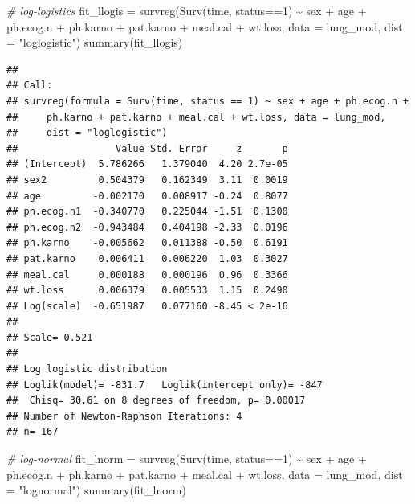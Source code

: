 \documentclass[
]{article}
\newenvironment{Shaded}{\begin{snugshade}}{\end{snugshade}}
\newcommand{\AttributeTok}[1]{\textcolor[rgb]{0.77,0.63,0.00}{#1}}
\newcommand{\CommentTok}[1]{\textcolor[rgb]{0.56,0.35,0.01}{\textit{#1}}}
\newcommand{\DecValTok}[1]{\textcolor[rgb]{0.00,0.00,0.81}{#1}}
\newcommand{\FunctionTok}[1]{\textcolor[rgb]{0.00,0.00,0.00}{#1}}
\newcommand{\NormalTok}[1]{#1}
\newcommand{\OtherTok}[1]{\textcolor[rgb]{0.56,0.35,0.01}{#1}}
\newcommand{\SpecialCharTok}[1]{\textcolor[rgb]{0.00,0.00,0.00}{#1}}
\newcommand{\StringTok}[1]{\textcolor[rgb]{0.31,0.60,0.02}{#1}}
\begin{document}
\begin{Shaded}
\begin{Highlighting}[]
\CommentTok{\# log{-}logistics}
\NormalTok{fit\_llogis }\OtherTok{=} \FunctionTok{survreg}\NormalTok{(}\FunctionTok{Surv}\NormalTok{(time, status}\SpecialCharTok{==}\DecValTok{1}\NormalTok{) }\SpecialCharTok{\textasciitilde{}}\NormalTok{ sex }\SpecialCharTok{+}\NormalTok{ age }\SpecialCharTok{+}\NormalTok{ ph.ecog.n }\SpecialCharTok{+}\NormalTok{ ph.karno }\SpecialCharTok{+}\NormalTok{ pat.karno }\SpecialCharTok{+}\NormalTok{ meal.cal }\SpecialCharTok{+}\NormalTok{ wt.loss,}
                     \AttributeTok{data =}\NormalTok{ lung\_mod, }\AttributeTok{dist =} \StringTok{"loglogistic"}\NormalTok{)}
\FunctionTok{summary}\NormalTok{(fit\_llogis)}
\end{Highlighting}
\end{Shaded}

\begin{verbatim}
## 
## Call:
## survreg(formula = Surv(time, status == 1) ~ sex + age + ph.ecog.n + 
##     ph.karno + pat.karno + meal.cal + wt.loss, data = lung_mod, 
##     dist = "loglogistic")
##                 Value Std. Error     z       p
## (Intercept)  5.786266   1.379040  4.20 2.7e-05
## sex2         0.504379   0.162349  3.11  0.0019
## age         -0.002170   0.008917 -0.24  0.8077
## ph.ecog.n1  -0.340770   0.225044 -1.51  0.1300
## ph.ecog.n2  -0.943484   0.404198 -2.33  0.0196
## ph.karno    -0.005662   0.011388 -0.50  0.6191
## pat.karno    0.006411   0.006220  1.03  0.3027
## meal.cal     0.000188   0.000196  0.96  0.3366
## wt.loss      0.006379   0.005533  1.15  0.2490
## Log(scale)  -0.651987   0.077160 -8.45 < 2e-16
## 
## Scale= 0.521 
## 
## Log logistic distribution
## Loglik(model)= -831.7   Loglik(intercept only)= -847
##  Chisq= 30.61 on 8 degrees of freedom, p= 0.00017 
## Number of Newton-Raphson Iterations: 4 
## n= 167
\end{verbatim}

\begin{Shaded}
\begin{Highlighting}[]
\CommentTok{\# log{-}normal}
\NormalTok{fit\_lnorm }\OtherTok{=} \FunctionTok{survreg}\NormalTok{(}\FunctionTok{Surv}\NormalTok{(time, status}\SpecialCharTok{==}\DecValTok{1}\NormalTok{) }\SpecialCharTok{\textasciitilde{}}\NormalTok{ sex }\SpecialCharTok{+}\NormalTok{ age }\SpecialCharTok{+}\NormalTok{ ph.ecog.n }\SpecialCharTok{+}\NormalTok{ ph.karno }\SpecialCharTok{+}\NormalTok{ pat.karno }\SpecialCharTok{+}\NormalTok{ meal.cal }\SpecialCharTok{+}\NormalTok{ wt.loss,}
                    \AttributeTok{data =}\NormalTok{ lung\_mod, }\AttributeTok{dist =} \StringTok{"lognormal"}\NormalTok{)}
\FunctionTok{summary}\NormalTok{(fit\_lnorm)}
\end{Highlighting}
\end{Shaded}
\end{document}
